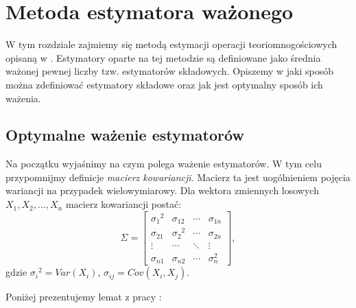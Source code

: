 \chapter{Metoda estymatora ważonego}
\thispagestyle{chapterBeginStyle}




W tym rozdziale zajmiemy się metodą estymacji operacji teoriomnogościowych opisaną w \cite{ting}. Estymatory oparte na tej metodzie są definiowane jako średnia ważonej pewnej liczby  tzw. estymatorów składowych. Opiszemy w jaki sposób można zdefiniować estymatory składowe oraz jak jest optymalny sposób ich ważenia. 

\section{Optymalne ważenie estymatorów}
Na początku wyjaśnimy na czym polega ważenie estymatorów.
W tym celu przypomnijmy definicje \textit{macierz kowariancji}. Macierz ta jest uogólnieniem pojęcia wariancji na przypadek wielowymiarowy. Dla wektora zmiennych losowych $X_1, X_2, \ldots, X_n$ macierz kowariancji postać:
\[
\Sigma =
  \begin{bmatrix}
    {{\sigma}_1}^2 & {\sigma}_{12} & \cdots & {\sigma}_{1n}  \\
    {{\sigma}_{21}} & {{\sigma}_{2}}^2 & \cdots & {\sigma}_{2n} \\
    \vdots & \cdots & \ddots & \vdots \\
    {{\sigma}_{n1}} & {{\sigma}_{n2}} & \cdots & {{\sigma}_{n}^2}
  \end{bmatrix},
\]
gdzie
    ${{\sigma}_i}^2 = Var(X_i)$,
    ${\sigma}_{ij} = Cov(X_i, X_j)$.


Poniżej prezentujemy lemat z pracy \cite{ting}:

